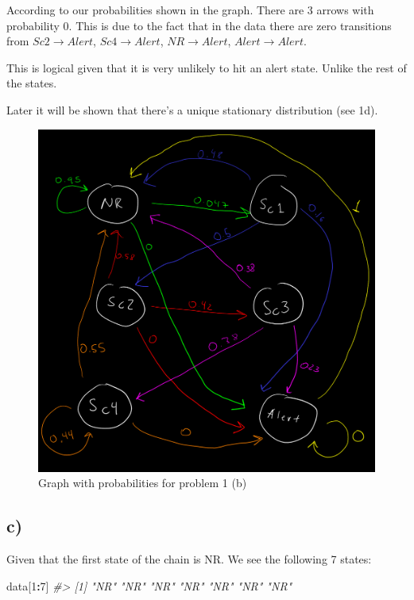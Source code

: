 \documentclass[]{article}
\newenvironment{Shaded}{\begin{snugshade}}{\end{snugshade}}
\newcommand{\CommentTok}[1]{\textcolor[rgb]{0.56,0.35,0.01}{\textit{#1}}}
\newcommand{\DecValTok}[1]{\textcolor[rgb]{0.00,0.00,0.81}{#1}}
\newcommand{\NormalTok}[1]{#1}
\newcommand{\OperatorTok}[1]{\textcolor[rgb]{0.81,0.36,0.00}{\textbf{#1}}}
\begin{document}
According to our probabilities shown in the graph. There are 3 arrows
with probability 0. This is due to the fact that in the data there are
zero transitions from \(Sc2 \rightarrow Alert\),
\(Sc4 \rightarrow Alert\), \(NR \rightarrow Alert\),
\(Alert \rightarrow Alert\).

This is logical given that it is very unlikely to hit an alert state.
Unlike the rest of the states.

Later it will be shown that there's a unique stationary distribution
(see 1d).

\begin{figure}
\centering
\includegraphics{./grafo1_probs.png}
\caption{Graph with probabilities for problem 1 (b)}
\end{figure}

\newpage

\hypertarget{c}{%
\subsection{c)}\label{c}}

Given that the first state of the chain is NR. We see the following 7
states:

\begin{Shaded}
\begin{Highlighting}[]
\NormalTok{data[}\DecValTok{1}\OperatorTok{:}\DecValTok{7}\NormalTok{]}
\CommentTok{#> [1] "NR" "NR" "NR" "NR" "NR" "NR" "NR"}
\end{Highlighting}
\end{Shaded}
\end{document}
